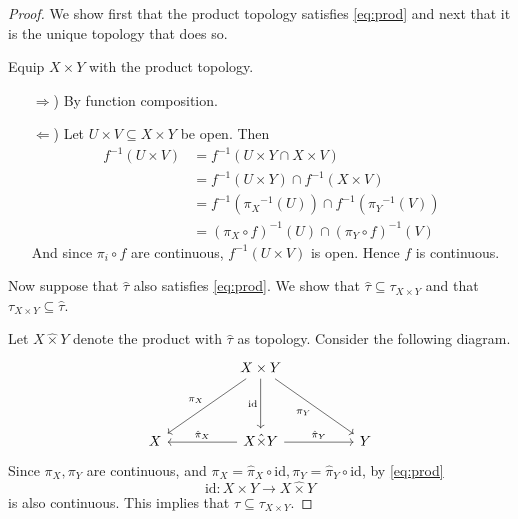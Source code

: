 \begin{proof}
  We show first that the product topology satisfies
  \eqref{eq:prod} and next that it is the unique
  topology that does so.

  Equip \( X \times Y \) with the product topology.
  \begin{enumerate}
    \item[\( \Rightarrow \))] 
      By function composition.
    \item[\( \Leftarrow \))]
      Let \( U \times V \subseteq X \times Y \) be open.
      Then
      \begin{align*}
        {f}^{-1} (U \times V) &= {f}^{-1} (U \times Y \cap X \times V) \\
                              &= {f}^{-1} (U \times Y) \cap {f}^{-1} (X \times V) \\
                              &= {f}^{-1} ({\pi_X}^{-1}(U) ) \cap {f}^{-1} ({\pi_Y}^{-1} (V) ) \\
                              &= {(\pi_X \circ f)}^{-1} (U) \cap {(\pi_Y \circ f)}^{-1} (V)
      \end{align*}
      And since \( \pi_i \circ f \) are continuous,
      \( {f}^{-1} (U \times V) \) is open. Hence \( f \) is continuous.
  \end{enumerate}

  Now suppose that \( \hat{\tau} \) also satisfies
  \eqref{eq:prod}. We show that
  \( \hat{\tau} \subseteq \tau_{X \times Y} \)
  and that \( \tau_{X \times Y} \subseteq \hat{\tau} \).

  Let \( X \hat{\times} Y \) denote the
  product with \( \hat{\tau} \) as topology.
  Consider the following diagram.
\[\begin{tikzcd}
	&& {X \times Y} \\
	\\
	X && {X \hat{\times} Y} && Y
	\arrow["{\pi_X}"', from=1-3, to=3-1]
	\arrow["{\text{id}}"', from=1-3, to=3-3]
	\arrow["{\pi_Y}"', from=1-3, to=3-5]
	\arrow["{\hat{\pi}_X}"', from=3-3, to=3-1]
	\arrow["{\hat{\pi}_Y}", from=3-3, to=3-5]
\end{tikzcd}\]
Since \( \pi_X, \pi_Y \) are continuous,
  and \( \pi_X = \hat{\pi}_X \circ \text{id}, \pi_Y = \hat{\pi}_Y \circ \text{id} \), by \eqref{eq:prod}
  \[
    \text{id}: X \times Y \to X \hat{\times} Y
  \]
  is also continuous. This implies that \( \hat{\tau} \subseteq \tau_{X\times Y} \).


\end{proof}
